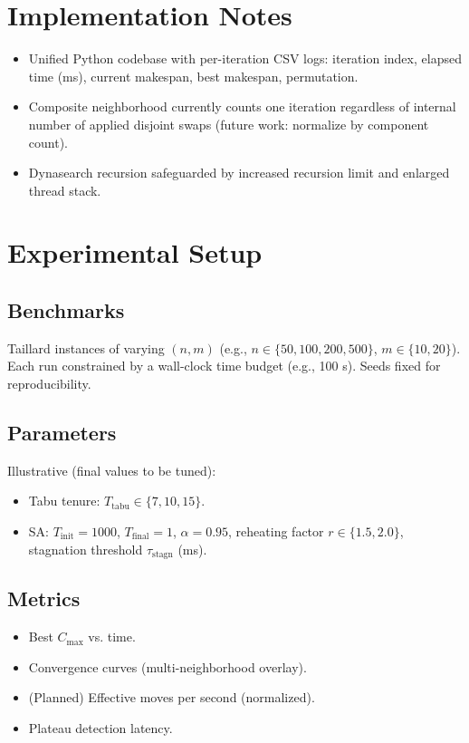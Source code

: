 \documentclass[runningheads]{llncs}
\begin{document}
\section{Implementation Notes}
\begin{itemize}
  \item Unified Python codebase with per-iteration CSV logs: iteration index, elapsed time (ms), current makespan, best makespan, permutation.
  \item Composite neighborhood currently counts one iteration regardless of internal number of applied disjoint swaps (future work: normalize by component count).
  \item Dynasearch recursion safeguarded by increased recursion limit and enlarged thread stack.
\end{itemize}

\section{Experimental Setup}
\subsection{Benchmarks}
Taillard instances \cite{ref_taillard} of varying $(n,m)$ (e.g., $n\in\{50,100,200,500\}$, $m\in\{10,20\}$). Each run constrained by a wall-clock time budget (e.g., 100 s). Seeds fixed for reproducibility.

\subsection{Parameters}
Illustrative (final values to be tuned):
\begin{itemize}
  \item Tabu tenure: $T_{\text{tabu}} \in \{7,10,15\}$.
  \item SA: $T_{\text{init}}=1000$, $T_{\text{final}}=1$, $\alpha=0.95$, reheating factor $r \in \{1.5,2.0\}$, stagnation threshold $\tau_{\text{stagn}}$ (ms).
\end{itemize}

\subsection{Metrics}
\begin{itemize}
  \item Best $C_{\max}$ vs. time.
  \item Convergence curves (multi-neighborhood overlay).
  \item (Planned) Effective moves per second (normalized).
  \item Plateau detection latency.
\end{itemize}
\end{document}
